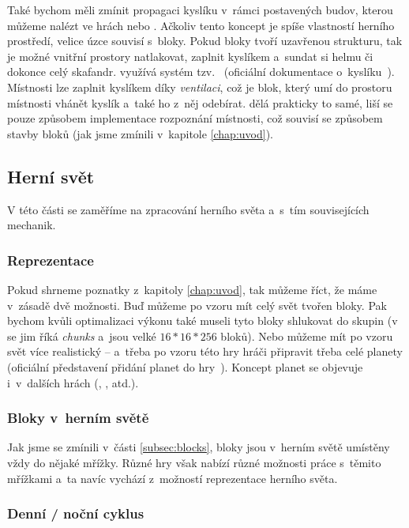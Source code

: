 Také bychom měli zmínit propagaci kyslíku v~rámci postavených budov, kterou můžeme nalézt ve hrách \SE{} nebo \TM{}. Ačkoliv tento koncept je spíše vlastností herního prostředí, velice úzce souvisí s~bloky. Pokud bloky tvoří uzavřenou strukturu, tak je možné vnitřní prostory natlakovat, zaplnit kyslíkem a~sundat si helmu či dokonce celý skafandr. \SE{} využívá systém tzv.~ (oficiální dokumentace o~kyslíku~\citep{se_oxygen}). Místnosti lze zaplnit kyslíkem díky \textit{ventilaci}, což je blok, který umí do prostoru místnosti vhánět kyslík a~také ho z~něj odebírat. \TM{} dělá prakticky to samé, liší se pouze způsobem implementace rozpoznání místnosti, což souvisí se způsobem stavby bloků (jak jsme zmínili v~kapitole \ref{chap:uvod}).


\subsection{Herní svět}

V této části se zaměříme na zpracování herního světa a~s~tím souvisejících mechanik.

\subsubsection{Reprezentace}

Pokud shrneme poznatky z~kapitoly \ref{chap:uvod}, tak můžeme říct, že máme v~zásadě dvě možnosti. Buď můžeme po vzoru \MC{} mít celý svět tvořen bloky. Pak bychom kvůli optimalizaci výkonu také museli tyto bloky shlukovat do skupin (v  se jim říká \textit{chunks} a~jsou velké $16*16*256$ bloků). Nebo můžeme mít po vzoru \SE{} svět více realistický -- a~třeba po vzoru této hry hráči připravit třeba celé planety (oficiální představení přidání planet do hry~\citep{se_planets}). Koncept planet se objevuje i~v~dalších hrách (\ME{}, \NMS{}, atd.).

\subsubsection{Bloky v~herním světě}

Jak jsme se zmínili v~části \ref{subsec:blocks}, bloky jsou v~herním světě umístěny vždy do nějaké mřížky. Různé hry však nabízí různé možnosti práce s~těmito mřížkami a~ta navíc vychází z~možností reprezentace herního světa.


\subsubsection{Denní / noční cyklus}

